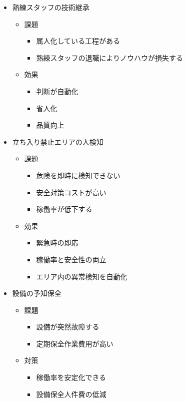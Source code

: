 \begin{itemize}
\begin{itemize}
\begin{itemize}
\begin{itemize}
			\end{itemize}
		\end{itemize}
		\item 熟練スタッフの技術継承
		\begin{itemize}
			\item 課題
			\begin{itemize}
				\item 属人化している工程がある
				\item 熟練スタッフの退職によりノウハウが損失する
			\end{itemize}
			\item 効果
			\begin{itemize}
				\item 判断が自動化
				\item 省人化
				\item 品質向上
			\end{itemize}
		\end{itemize}
		\item 立ち入り禁止エリアの人検知
		\begin{itemize}
			\item 課題
			\begin{itemize}
				\item 危険を即時に検知できない
				\item 安全対策コストが高い
				\item 稼働率が低下する
			\end{itemize}
			\item 効果
			\begin{itemize}
				\item 緊急時の即応
				\item 稼働率と安全性の両立
				\item エリア内の異常検知を自動化
			\end{itemize}
		\end{itemize}
		\item 設備の予知保全
		\begin{itemize}
			\item 課題
			\begin{itemize}
				\item 設備が突然故障する
				\item 定期保全作業費用が高い
			\end{itemize}
			\item 対策
			\begin{itemize}
				\item 稼働率を安定化できる
				\item 設備保全人件費の低減

\end{itemize}
\end{itemize}
\end{itemize}
\end{itemize}
